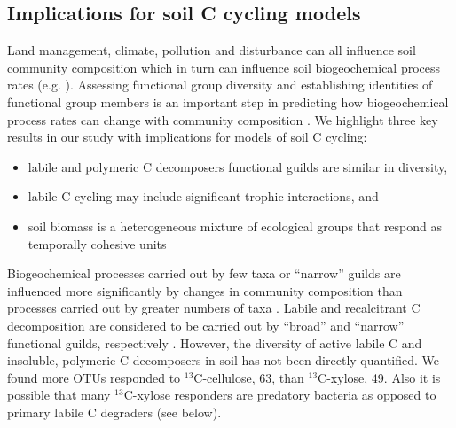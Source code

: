\subsection{Implications for soil C cycling models}
Land management, climate, pollution and disturbance can all influence soil
community composition \citep{McGuire2010} which in turn can influence soil
biogeochemical process rates (e.g. \citep{Berlemont2014a}). Assessing
functional group diversity and establishing identities of functional group
members is an important step in predicting how biogeochemical process rates can
change with community composition \citep{Schimel_1995,McGuire2010}. We
highlight three key results in our study with implications for models of soil
C cycling: \begin{itemize} \item labile and polymeric C decomposers functional
guilds are similar in diversity, \item labile C cycling may include significant
trophic interactions, and \item soil biomass is a heterogeneous mixture of
ecological groups that respond as temporally cohesive units \end{itemize}

Biogeochemical processes carried out by few taxa or ``narrow'' guilds are
influenced more significantly by changes in community composition than
processes carried out by greater numbers of taxa
\citep{Schimel_1995,McGuire2010}. Labile and recalcitrant C decomposition are
considered to be carried out by ``broad'' and ``narrow'' functional guilds,
respectively \citep{Schimel_1995,McGuire2010}. However, the diversity of active
labile C and insoluble, polymeric C decomposers in soil has not been directly
quantified. We found more OTUs responded to $^{13}$C-cellulose, 63, than
$^{13}$C-xylose, 49. Also it is possible that many $^{13}$C-xylose responders
are predatory bacteria as opposed to primary labile C degraders (see below).

